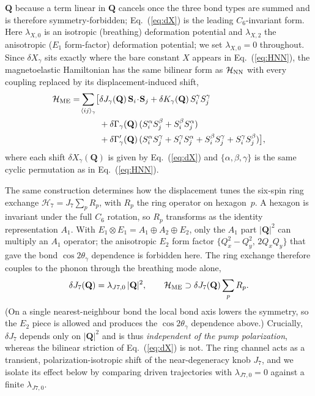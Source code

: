 \documentclass[aps,prb,twocolumn,superscriptaddress,floatfix,nofootinbib]{revtex4-2}
\begin{document}
$\mathbf{Q}$ because a term linear in $\mathbf{Q}$ cancels once the three bond
types are summed and is therefore symmetry-forbidden; Eq.~(\ref{eq:dX}) is the
leading $C_6$-invariant form.  Here $\lambda_{X,0}$ is an isotropic
(breathing) deformation potential and $\lambda_{X,2}$ the anisotropic
($E_1$ form-factor) deformation potential; we set $\lambda_{X,0}=0$ throughout.
Since $\delta X_\gamma$ sits exactly where the bare constant $X$ appears in
Eq.~(\ref{eq:HNN}), the magnetoelastic Hamiltonian has the same bilinear form as
$\mathcal{H}_{\rm NN}$ with every coupling replaced by its displacement-induced
shift,
\begin{equation}
\begin{split}
\mathcal{H}_{\rm ME}=\!\sum_{\langle ij\rangle_\gamma}\!\big[
  &\delta J_\gamma(\mathbf{Q})\,\mathbf{S}_i\!\cdot\!\mathbf{S}_j
  +\delta K_\gamma(\mathbf{Q})\,S_i^\gamma S_j^\gamma \\
  &+\delta\Gamma_\gamma(\mathbf{Q})\,(S_i^\alpha S_j^\beta+S_i^\beta S_j^\alpha)\\
  &+\delta\Gamma'_\gamma(\mathbf{Q})\,(S_i^\alpha S_j^\gamma+S_i^\gamma S_j^\alpha
        +S_i^\beta S_j^\gamma+S_i^\gamma S_j^\beta)\big],
\end{split}
\label{eq:HME}
\end{equation}
where each shift $\delta X_\gamma(\mathbf{Q})$ is given by Eq.~(\ref{eq:dX}) and
$\{\alpha,\beta,\gamma\}$ is the same cyclic permutation as in
Eq.~(\ref{eq:HNN}).

The same construction determines how the displacement tunes the six-spin ring
exchange $\mathcal{H}_7=J_7\sum_p R_p$, with $R_p$ the ring operator on
hexagon~$p$.  A hexagon is invariant under the full $C_6$ rotation, so $R_p$
transforms as the identity representation $A_1$.  With $E_1\otimes E_1
= A_1\oplus A_2\oplus E_2$, only the $A_1$ part $|\mathbf{Q}|^2$ can multiply an
$A_1$ operator; the anisotropic $E_2$ form factor
$\{Q_x^2-Q_y^2,\,2Q_xQ_y\}$ that gave the bond $\cos2\theta_\gamma$ dependence is
forbidden here.  The ring exchange therefore couples to the phonon through the
breathing mode alone,
\begin{equation}
\delta J_7(\mathbf{Q}) = \lambda_{J7,0}\,|\mathbf{Q}|^2 ,
\qquad
\mathcal{H}_{\rm ME}\supset \delta J_7(\mathbf{Q})\sum_p R_p .
\label{eq:dJ7}
\end{equation}
(On a single nearest-neighbour bond the local bond axis lowers the symmetry, so
the $E_2$ piece is allowed and produces the $\cos2\theta_\gamma$ dependence
above.)  Crucially, $\delta J_7$ depends only on $|\mathbf{Q}|^2$ and is thus
\emph{independent of the pump polarization}, whereas the bilinear striction of
Eq.~(\ref{eq:dX}) is not.  The ring channel acts as a transient,
polarization-isotropic shift of the near-degeneracy knob $J_7$, and we isolate
its effect below by comparing driven trajectories with $\lambda_{J7,0}=0$ against
a finite $\lambda_{J7,0}$.
\end{document}
